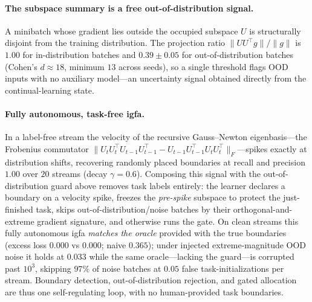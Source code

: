 \documentclass[10pt,a4paper]{article}
\theoremstyle{plain}
\theoremstyle{definition}
\newcommand{\IGFA}{igfa}
\begin{document}
\paragraph{The subspace summary is a free out-of-distribution signal.} A minibatch whose
gradient lies outside the occupied subspace $U$ is structurally disjoint from the training
distribution. The projection ratio $\|UU^\top g\|/\|g\|$ is $1.00$ for in-distribution batches
and $0.39\pm0.05$ for out-of-distribution batches (Cohen's $d\approx18$, minimum $13$ across
seeds), so a single threshold flags OOD inputs with no auxiliary model---an uncertainty signal
obtained directly from the continual-learning state.

\paragraph{Fully autonomous, task-free \IGFA.} In a label-free stream the velocity of the
recursive Gauss--Newton eigenbasis---the Frobenius commutator
$\|U_tU_t^\top U_{t-1}U_{t-1}^\top-U_{t-1}U_{t-1}^\top U_tU_t^\top\|_F$---spikes exactly at
distribution shifts, recovering randomly placed boundaries at recall and precision $1.00$ over
$20$ streams (decay $\gamma=0.6$). Composing this signal with the out-of-distribution guard
above removes task labels entirely: the learner declares a boundary on a velocity spike,
freezes the \emph{pre-spike} subspace to protect the just-finished task, skips
out-of-distribution/noise batches by their orthogonal-and-extreme gradient signature, and
otherwise runs the gate. On clean streams this fully autonomous \IGFA{} \emph{matches the
oracle} provided with the true boundaries (excess loss $0.000$ vs $0.000$; naive $0.365$); under
injected extreme-magnitude OOD noise it holds at $0.033$ while the same oracle---lacking the
guard---is corrupted past $10^{3}$, skipping $97\%$ of noise batches at $0.05$ false
task-initializations per stream. Boundary detection, out-of-distribution rejection, and gated
allocation are thus one self-regulating loop, with no human-provided task boundaries.
\end{document}
